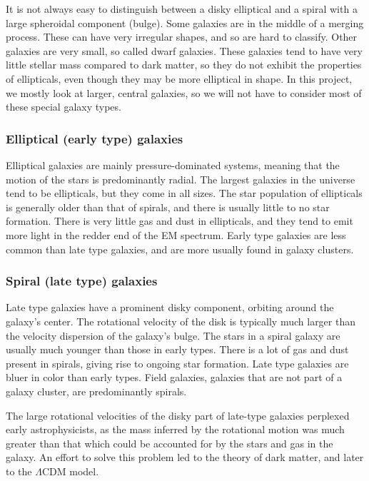 It is not always easy to distinguish between a disky elliptical and a spiral with a large spheroidal component (bulge). Some galaxies are in the middle of a merging process. These can have very irregular shapes, and so are hard to classify. Other galaxies are very small, so called dwarf galaxies. These galaxies tend to have very little stellar mass compared to dark matter, so they do not exhibit the properties of ellipticals, even though they may be more elliptical in shape. In this project, we mostly look at larger, central galaxies, so we will not have to consider most of these special galaxy types.

\subsubsection{Elliptical (early type) galaxies}
Elliptical galaxies are mainly pressure-dominated systems, meaning that the motion of the stars is predominantly radial. The largest galaxies in the universe tend to be ellipticals, but they come in all sizes. The star population of ellipticals is generally older than that of spirals, and there is usually little to no star formation. There is very little gas and dust in ellipticals, and they tend to emit more light in the redder end of the EM spectrum. Early type galaxies are less common than late type galaxies, and are more usually found in galaxy clusters.

\subsubsection{Spiral (late type) galaxies}
Late type galaxies have a prominent disky component, orbiting around the galaxy's center. The rotational velocity of the disk is typically much larger than the velocity dispersion of the galaxy's bulge. The stars in a spiral galaxy are usually much younger than those in early types. There is a lot of gas and dust present in spirals, giving rise to ongoing star formation. Late type galaxies are bluer in color than early types. Field galaxies, galaxies that are not part of a galaxy cluster, are predominantly spirals. 

The large rotational velocities of the disky part of late-type galaxies perplexed early astrophysicists, as the mass inferred by the rotational motion was much greater than that which could be accounted for by the stars and gas in the galaxy. An effort to solve this problem led to the theory of dark matter, and later to the $\Lambda$CDM model.


